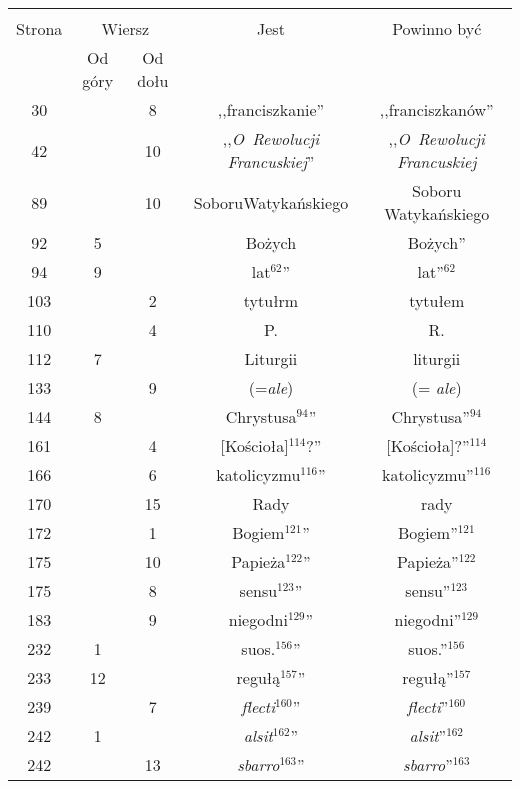 \documentclass[a4paper,11pt]{article}
\begin{document}
\begin{center}
  \begin{tabular}{|c|c|c|c|c|}
    \hline
    & \multicolumn{2}{c|}{} & & \\
    Strona & \multicolumn{2}{c|}{Wiersz} & Jest
                              & Powinno być \\ \cline{2-3}
    & Od góry & Od dołu & & \\
    \hline
    30  & &  8 & ,,franciszkanie'' & ,,franciszkanów'' \\
    42  & & 10 & ,,\emph{O~Rewolucji Francuskiej}''
           & ,,\emph{O~Rewolucji Francuskiej} \\
    89  & & 10 & SoboruWatykańskiego & Soboru Watykańskiego \\
    92  &  5 & & Bożych & Bożych'' \\
    94  &  9 & & lat$^{ 62 }$'' & lat''$^{ 62 }$ \\
    103 & &  2 & tytułrm & tytułem \\
    110 & &  4 & P. & R. \\
    112 &  7 & & Liturgii & liturgii \\
    133 & &  9 & (=\emph{ale}) & (= \emph{ale}) \\
    144 &  8 & & Chrystusa$^{ 94 }$'' & Chrystusa''$^{ 94 }$\\
    161 & &  4 & [Kościoła]$^{ 114 }$?'' & [Kościoła]?''$^{ 114 }$ \\
    166 & &  6 & katolicyzmu$^{ 116 }$'' & katolicyzmu''$^{ 116 }$ \\
    170 & & 15 & Rady & rady \\
    172 & &  1 & Bogiem$^{ 121 }$'' & Bogiem''$^{ 121 }$ \\
    175 & & 10 & Papieża$^{ 122 }$'' & Papieża''$^{ 122 }$ \\
    175 & &  8 & sensu$^{ 123 }$'' & sensu''$^{ 123 }$ \\
    183 & &  9 & niegodni$^{ 129 }$'' & niegodni''$^{ 129 }$ \\
    232 &  1 & & suos.$^{ 156 }$'' & suos.''$^{ 156 }$ \\
    233 & 12 & & regułą$^{ 157 }$'' & regułą''$^{ 157 }$ \\
    239 & &  7 & \emph{flecti}$^{ 160 }$'' & \emph{flecti}''$^{ 160 }$ \\
    242 &  1 & & \emph{alsit}$^{ 162 }$'' & \emph{alsit}''$^{ 162 }$ \\
    242 & & 13 & \emph{sbarro}$^{ 163 }$'' & \emph{sbarro}''$^{ 163 }$ \\

\end{tabular}
\end{center}
\end{document}
